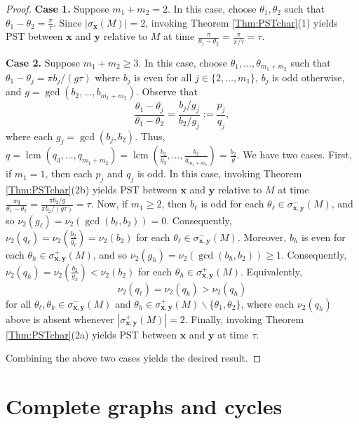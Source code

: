 \documentclass[11pt]{article}
\newcommand{\bx}{\mathbf x}
\newcommand{\by}{\mathbf y}
\begin{document}
\begin{proof}
\noindent \textbf{Case 1.} Suppose $m_1+m_2=2$. In this case, choose $\theta_1,\theta_2$ such that $\theta_1-\theta_2=\frac{\pi}{\tau}$. Since $|\sigma_{\bx}(M)|=2$, invoking Theorem \ref{Thm:PSTchar}(1) yields PST between $\bx$ and $\by$ relative to $M$ at time $\frac{\pi}{\theta_1-\theta_2}=\frac{\pi}{\pi/\tau}=\tau$.

\noindent \textbf{Case 2.} Suppose $m_1+m_2\geq 3$. In this case, choose $\theta_1,\ldots,\theta_{m_1+m_2}$ such that $\theta_1-\theta_j=\pi b_j/(g\tau)$ where $b_j$ is even for all $j\in\{2,\ldots,m_1\}$, $b_j$ is odd otherwise, and $g=\operatorname{gcd}(b_2,\ldots,b_{m_1+m_2})$. Observe that
\begin{equation}
\label{Eq:PST}
\frac{\theta_1-\theta_j}{\theta_1-\theta_2}=\frac{b_j/g_j}{b_2/g_j}:=\frac{p_j}{q_j},
\end{equation}
where each $g_j=\operatorname{gcd}(b_j,b_2)$.
Thus, $q=\operatorname{lcm}(q_3,\ldots,q_{m_1+m_2})=\operatorname{lcm}(\frac{b_2}{g_3},\ldots,\frac{b_2}{g_{m_1+m_2}})=\frac{b_2}{g}$. We have two cases. First, if $m_1=1$, then each $p_j$ and $q_j$ is odd. In this case, invoking Theorem \ref{Thm:PSTchar}(2b) yields PST between $\bx$ and $\by$ relative to $M$ at time $\frac{\pi q}{\theta_1-\theta_2}=\frac{\pi b_2/g}{\pi b_2/ (g\tau)}=\tau$. Now, if $m_1\geq 2$, then $b_{\ell}$ is odd for each $\theta_{\ell}\in\sigma_{\bx,\by}^-(M)$, and so $\nu_2(g_{\ell})=\nu_2(\operatorname{gcd}(b_{\ell},b_2))=0$. Consequently,  $\nu_2(q_{\ell})=\nu_2(\frac{b_2}{g_{\ell}})=\nu_2(b_2)$ for each $\theta_{\ell}\in\sigma_{\bx,\by}^-(M)$. Moreover, $b_{h}$ is even for each $\theta_{h}\in\sigma_{\bx,\by}^+(M)$, and so $\nu_2(g_{h})=\nu_2(\operatorname{gcd}(b_{h},b_2))\geq 1$. Consequently,  $\nu_2(q_{h})=\nu_2(\frac{b_2}{g_{h}})<\nu_2(b_2)$ for each $\theta_{h}\in\sigma_{\bx,\by}^+(M)$. Equivalently, $$\nu_2(q_{\ell})=\nu_2(q_{k})>\nu_2(q_h)$$ for all $\theta_{\ell},\theta_k\in \sigma_{\bx,\by}^-(M)$ and $\theta_h\in \sigma_{\bx,\by}^+(M)\backslash\{\theta_1,\theta_2\}$, where each $\nu_2(q_h)$ above is absent whenever $|\sigma_{\bx,\by}^+(M)|=2$. Finally, invoking Theorem \ref{Thm:PSTchar}(2a) yields PST between $\bx$ and $\by$ at time $\tau$.

Combining the above two cases yields the desired result.
\end{proof}

\section{Complete graphs and cycles}\label{Sec:cycle}
\end{document}
